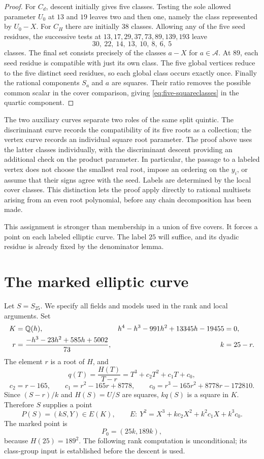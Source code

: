 \begin{proof}
For $C_d$, descent initially gives five classes. Testing the sole
allowed parameter $U_0$ at $13$ and $19$ leaves two and then one,
namely the class represented by $U_0-X$. For $C_H$ there are initially
38 classes. Allowing any of the five seed residues, the successive
tests at $13,17,29,37,73,89,139,193$ leave
\[
 30,\ 22,\ 14,\ 13,\ 10,\ 8,\ 6,\ 5
\]
classes. The final set consists precisely of the classes $a-X$ for
$a\in\mathcal A$. At $89$, each seed residue is compatible with just
its own class. The five global vertices reduce to the five distinct
seed residues, so each global class occurs exactly once. Finally the
rational components $S_a$ and $a$ are squares. Their ratio removes
the possible common scalar in the cover comparison, giving
\eqref{eq:five-squareclasses} in the quartic component.
\end{proof}

The two auxiliary curves separate two roles of the same split quintic.
The discriminant curve records the compatibility of its five roots as
a collection; the vertex curve records an individual square root
parameter. The proof above uses the latter classes individually, with
the discriminant descent providing an additional check on the product
parameter. In particular, the passage to a labeled vertex does not
choose the smallest real root, impose an ordering on the $y_i$, or
assume that their signs agree with the seed. Labels are determined by
the local cover classes. This distinction lets the proof apply directly
to rational multisets arising from an even root polynomial, before
any chain decomposition has been made.

This assignment is stronger than membership in a union of five covers.
It forces a point on each labeled elliptic curve. The label $25$ will
suffice, and its dyadic residue is already fixed by the denominator lemma.

\section{The marked elliptic curve}\label{sec:marked}

Let $S=S_{25}$. We specify all fields and models used in the rank and
local arguments. Set
\begin{align}
 K&=\mathbb Q(h),&h^4-h^3-991h^2+13345h-19455&=0,\label{eq:quartic-K}\\
 r&=\frac{-h^3-23h^2+585h+5002}{73},&k&=25-r.\label{eq:r-and-k}
\end{align}
The element $r$ is a root of $H$, and
\[
 q(T)=\frac{H(T)}{T-r}=T^3+c_2T^2+c_1T+c_0,
\]\[
 c_2=r-165,\qquad c_1=r^2-165r+8778,\qquad
 c_0=r^3-165r^2+8778r-172810.
\]
Since $(S-r)/k$ and $H(S)=U/S$ are squares, $kq(S)$ is a square in
$K$. Therefore $S$ supplies a point
\begin{equation}\label{eq:marked-curve}
 P(S)=(kS,Y)\in E(K),\qquad
 E:\ Y^2=X^3+kc_2X^2+k^2c_1X+k^3c_0.
\end{equation}
The marked point is
\begin{equation}\label{eq:marked-point}
 P_0=(25k,189k),
\end{equation}
because $H(25)=189^2$. The following rank computation is unconditional;
its class-group input is established before the descent is used.

